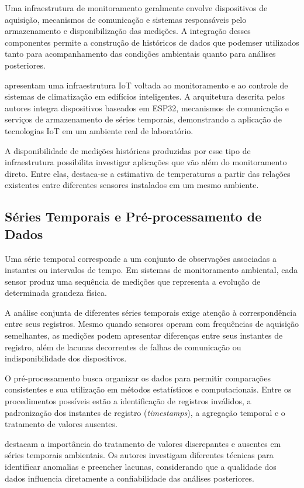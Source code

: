 Uma infraestrutura de monitoramento geralmente envolve dispositivos de aquisição, mecanismos de comunicação e sistemas responsáveis pelo armazenamento e disponibilização das medições. A integração desses componentes permite a construção de históricos de dados que podemser utilizados tanto para acompanhamento das condições ambientais quanto para análises posteriores.

 apresentam uma infraestrutura IoT voltada ao monitoramento e ao controle de sistemas de climatização em edifícios inteligentes. A arquitetura descrita pelos autores integra dispositivos baseados em ESP32, mecanismos de comunicação e serviços de armazenamento de séries temporais, demonstrando a aplicação de tecnologias IoT em um ambiente real de laboratório.

A disponibilidade de medições históricas produzidas por esse tipo de infraestrutura possibilita investigar aplicações que vão além do monitoramento direto. Entre elas, destaca-se a estimativa de temperaturas a partir das relações existentes entre diferentes sensores instalados em um mesmo ambiente.


\subsection{Séries Temporais e Pré-processamento de Dados}
\label{subsec:series_temporais}

Uma série temporal corresponde a um conjunto de observações associadas a instantes ou intervalos de tempo. Em sistemas de monitoramento ambiental, cada sensor produz uma sequência de medições que representa a evolução de determinada grandeza física.

A análise conjunta de diferentes séries temporais exige atenção à correspondência entre seus registros. Mesmo quando sensores operam com frequências de aquisição semelhantes, as medições podem apresentar diferenças entre seus instantes de registro, além de lacunas decorrentes de falhas de comunicação ou indisponibilidade dos dispositivos.

O pré-processamento busca organizar os dados para permitir comparações consistentes e sua utilização em métodos estatísticos e computacionais. Entre os procedimentos possíveis estão a identificação de registros inválidos, a padronização dos instantes de registro (\textit{timestamps}), a agregação temporal e o tratamento de valores ausentes.

 destacam a importância do tratamento de valores discrepantes e ausentes em séries temporais ambientais. Os autores investigam diferentes técnicas para identificar anomalias e preencher lacunas, considerando que a qualidade dos dados influencia diretamente a confiabilidade das análises posteriores.

